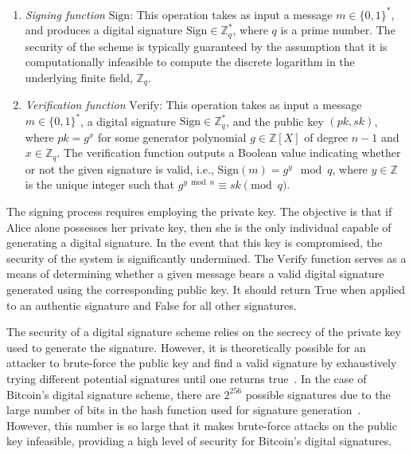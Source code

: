 \begin{enumerate}
    \item \emph{Signing function} $\text{Sign}$: This operation takes as input a message $m \in \{0, 1\}^*$, and produces a digital signature
    $\text{Sign} \in \mathbb{Z}_q^*$, where $q$ is a prime number. The security of the scheme is typically guaranteed by the assumption that
    it is computationally infeasible to compute the discrete logarithm in the underlying finite field, $\mathbb{Z}_q$.

    \item \emph{Verification function} $\text{Verify}$: This operation takes as input a message $m \in \{0, 1\}^*$, a digital signature
    $\text{Sign} \in \mathbb{Z}_q^*$, and the public key $(pk, sk)$, where $pk = g^x$ for some generator polynomial $g \in \mathbb{Z}[X]$
    of degree $n-1$ and $x \in \mathbb{Z}_q$. The verification function outputs a Boolean value indicating whether or not the given signature
    is valid, i.e., $\text{Sign}(m) = g^y \mod q$, where $y \in \mathbb{Z}$ is the unique integer such that $g^{y\bmod{n}} \equiv sk \pmod{q}$.

\end{enumerate}

The signing process requires employing the private key. The objective is that if Alice alone possesses her private key, then she is the only
individual capable of generating a digital signature. In the event that this key is compromised, the security of the system is significantly
undermined. The $\text{Verify}$ function serves as a means of determining whether a given message bears a valid digital signature generated using the
corresponding public key. It should return True when applied to an authentic signature and False for all other signatures.

The security of a digital signature scheme relies on the secrecy of the private key used to generate the signature. However, it is
theoretically possible for an attacker to brute-force the public key and find a valid signature by exhaustively trying different potential
signatures until one returns true~\cite{boneh2001short}. In the case of Bitcoin's digital signature scheme, there are $2^{256}$ possible signatures due to the large number of bits in the hash function
used for signature generation~\cite{dss}. However, this number is so large that it makes brute-force attacks on the public key infeasible,
providing a high level of security for Bitcoin's digital signatures.
